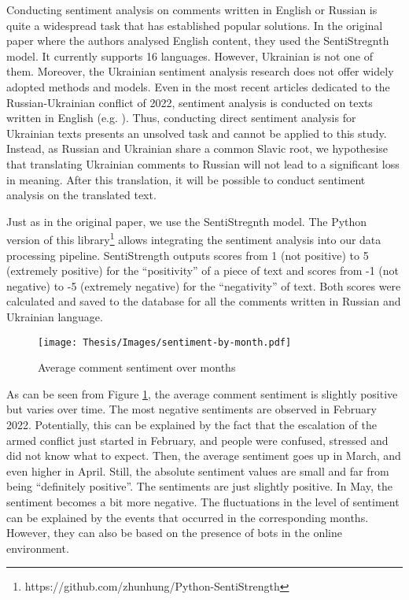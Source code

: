 Conducting sentiment analysis on comments written in English or Russian is quite a widespread task that has established popular solutions. In the original paper where the authors analysed English content, they used the SentiStregnth model. It currently supports 16 languages. However, Ukrainian is not one of them. Moreover, the Ukrainian sentiment analysis research does not offer widely adopted methods and models. Even in the most recent articles dedicated to the Russian-Ukrainian conflict of 2022, sentiment analysis is conducted on texts written in English (e.g. \cite{caprolu2022characterizing}). Thus, conducting direct sentiment analysis for Ukrainian texts presents an unsolved task and cannot be applied to this study. Instead, as Russian and Ukrainian share a common Slavic root, we hypothesise that translating Ukrainian comments to Russian will not lead to a significant loss in meaning. After this translation, it will be possible to conduct sentiment analysis on the translated text.

Just as in the original paper\cite{Hagen2022}, we use the SentiStregnth model. The Python version of this library\footnote{https://github.com/zhunhung/Python-SentiStrength} allows integrating the sentiment analysis into our data processing pipeline. SentiStrength outputs scores from 1 (not positive) to 5 (extremely positive) for the ``positivity'' of a piece of text and scores from -1 (not negative) to -5 (extremely negative) for the ``negativity'' of text. Both scores were calculated and saved to the database for all the comments written in Russian and Ukrainian language.

\begin{figure}
	\centering
	\texttt{[image: Thesis/Images/sentiment-by-month.pdf]}
	\caption{Average comment sentiment over months}
	\label{fig:sentiment-by-month}
\end{figure}

As can be seen from Figure \ref{fig:sentiment-by-month}, the average comment sentiment is slightly positive but varies over time. The most negative sentiments are observed in February 2022. Potentially, this can be explained by the fact that the escalation of the armed conflict just started in February, and people were confused, stressed and did not know what to expect. Then, the average sentiment goes up in March, and even higher in April. Still, the absolute sentiment values are small and far from being ``definitely positive''. The sentiments are just slightly positive. In May, the sentiment becomes a bit more negative. The fluctuations in the level of sentiment can be explained by the events that occurred in the corresponding months. However, they can also be based on the presence of bots in the online environment.

